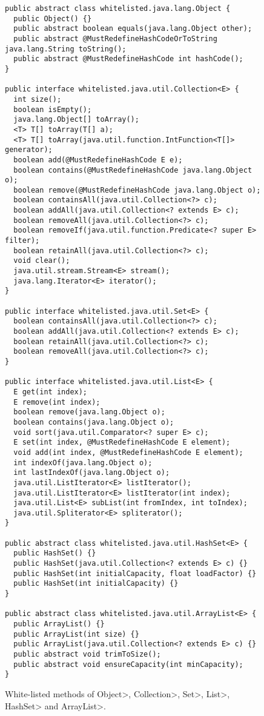 \begin{figure}
{\scriptsize\begin{verbatim}
public abstract class whitelisted.java.lang.Object {
  public Object() {}
  public abstract boolean equals(java.lang.Object other);
  public abstract @MustRedefineHashCodeOrToString java.lang.String toString();
  public abstract @MustRedefineHashCode int hashCode();
}

public interface whitelisted.java.util.Collection<E> {
  int size();
  boolean isEmpty();
  java.lang.Object[] toArray();
  <T> T[] toArray(T[] a);
  <T> T[] toArray(java.util.function.IntFunction<T[]> generator);
  boolean add(@MustRedefineHashCode E e);
  boolean contains(@MustRedefineHashCode java.lang.Object o);
  boolean remove(@MustRedefineHashCode java.lang.Object o);
  boolean containsAll(java.util.Collection<?> c);
  boolean addAll(java.util.Collection<? extends E> c);
  boolean removeAll(java.util.Collection<?> c);
  boolean removeIf(java.util.function.Predicate<? super E> filter);
  boolean retainAll(java.util.Collection<?> c);
  void clear();
  java.util.stream.Stream<E> stream();
  java.lang.Iterator<E> iterator();
}

public interface whitelisted.java.util.Set<E> {
  boolean containsAll(java.util.Collection<?> c);
  boolean addAll(java.util.Collection<? extends E> c);
  boolean retainAll(java.util.Collection<?> c);
  boolean removeAll(java.util.Collection<?> c);
}

public interface whitelisted.java.util.List<E> {
  E get(int index);
  E remove(int index);
  boolean remove(java.lang.Object o);
  boolean contains(java.lang.Object o);
  void sort(java.util.Comparator<? super E> c);
  E set(int index, @MustRedefineHashCode E element);
  void add(int index, @MustRedefineHashCode E element);
  int indexOf(java.lang.Object o);
  int lastIndexOf(java.lang.Object o);
  java.util.ListIterator<E> listIterator();
  java.util.ListIterator<E> listIterator(int index);
  java.util.List<E> subList(int fromIndex, int toIndex);
  java.util.Spliterator<E> spliterator();
}

public abstract class whitelisted.java.util.HashSet<E> {
  public HashSet() {}
  public HashSet(java.util.Collection<? extends E> c) {}
  public HashSet(int initialCapacity, float loadFactor) {}
  public HashSet(int initialCapacity) {}
}

public abstract class whitelisted.java.util.ArrayList<E> {
  public ArrayList() {}
  public ArrayList(int size) {}
  public ArrayList(java.util.Collection<? extends E> c) {}
  public abstract void trimToSize();
  public abstract void ensureCapacity(int minCapacity);
}
\end{verbatim}}
  \caption{White-listed methods of \<Object>,
    \<Collection>, \<Set>, \<List>, \<HashSet> and \<ArrayList>.}
\label{fig:fragment}
\end{figure}


